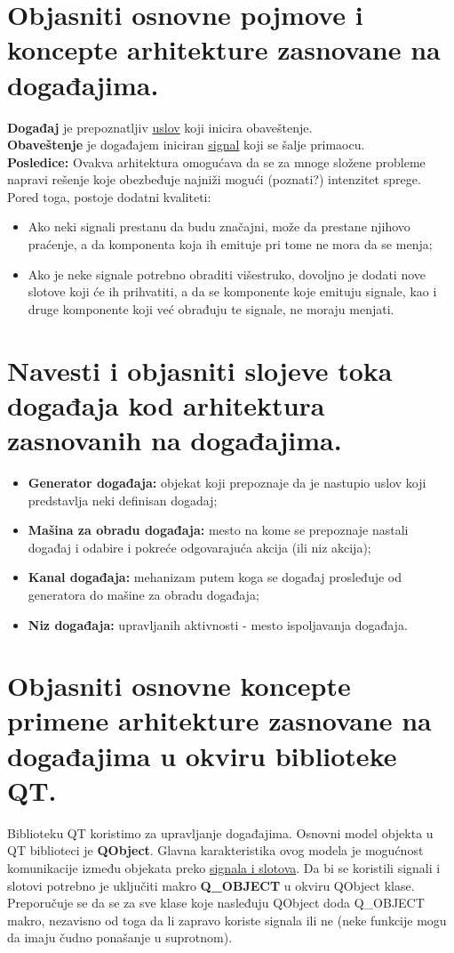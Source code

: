 \documentclass[a4paper]{article}
\begin{document}
\section{Objasniti osnovne pojmove i koncepte arhitekture zasnovane na događajima.}
  \noindent \textbf{Događaj} je prepoznatljiv \underline{uslov} koji inicira obaveštenje.\\
  \textbf{Obaveštenje} je događajem iniciran \underline{signal} koji se šalje primaocu.\\
  \textbf{Posledice:} Ovakva arhitektura omogućava da se za mnoge složene probleme napravi 
  rešenje koje obezbeđuje najniži mogući (poznati?) intenzitet sprege. 
  Pored toga, postoje dodatni kvaliteti:
  \begin{itemize}
    \item Ako neki signali prestanu da budu značajni, može da prestane njihovo praćenje, 
          a da komponenta koja ih emituje pri tome ne mora da se menja;
    \item Ako je neke signale potrebno obraditi višestruko, 
          dovoljno je dodati nove slotove koji će ih prihvatiti, a da se komponente koje 
          emituju signale, kao i druge komponente koji već obrađuju te signale, ne moraju menjati.
  \end{itemize}

\section{Navesti i objasniti slojeve toka događaja kod arhitektura zasnovanih na događajima.}
  \begin{itemize}
    \item \textbf{Generator događaja:} objekat koji prepoznaje da je nastupio uslov koji 
          predstavlja neki definisan dogadaj;
    \item \textbf{Mašina za obradu događaja:} mesto na kome se prepoznaje nastali događaj 
          i odabire i pokreće odgovarajuća akcija (ili niz akcija);
    \item \textbf{Kanal događaja:} mehanizam putem koga se događaj prosleđuje od generatora 
          do mašine za obradu događaja;
    \item \textbf{Niz događaja:} upravljanih aktivnosti - mesto ispoljavanja događaja.
  \end{itemize}

\section{Objasniti osnovne koncepte primene arhitekture zasnovane na događajima u okviru biblioteke QT.}
  Biblioteku QT koristimo za upravljanje događajima. Osnovni model objekta u QT biblioteci je 
  \textbf{QObject}. Glavna karakteristika ovog modela je mogućnost komunikacije između objekata preko
  \underline{signala i slotova}. Da bi se koristili signali i slotovi potrebno je uključiti makro
  \textbf{Q\_OBJECT} u okviru QObject klase. Preporučuje se da se za sve klase koje nasleđuju QObject 
  doda Q\_OBJECT makro, nezavisno od toga da li zapravo koriste signala ili ne (neke funkcije mogu
  da imaju čudno ponašanje u suprotnom). 
\end{document}
